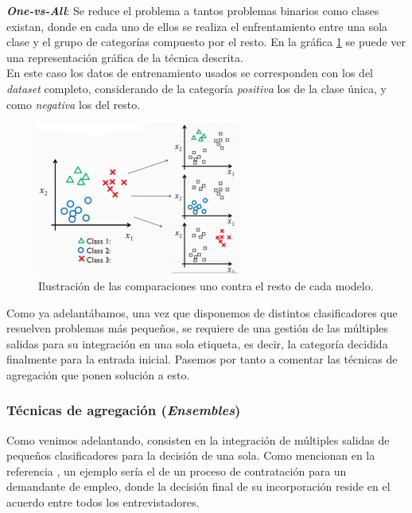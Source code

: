 \documentclass[]{article}
\begin{document}
			{\large \textbf{\textit{One-vs-All}}}: Se reduce el problema a tantos problemas binarios como clases existan, donde en cada uno de ellos se realiza el enfrentamiento entre una sola clase y el grupo de categorías compuesto por el resto. En la gráfica \ref{one-vs-all} se puede ver una representación gráfica de la técnica descrita.\\
			
			En este caso los datos de entrenamiento usados se corresponden con los del \textit{dataset} completo, considerando de la categoría \textit{positiva} los de la clase única, y como \textit{negativa} los del resto.\\
			
			\begin{figure}[h]
				\centering
				\includegraphics[width=0.6\textwidth]{./img/one-vs-all}
				\caption{Ilustración de las comparaciones uno contra el resto de cada modelo. \cite{binarization-slides}}
				\label{one-vs-all}
			\end{figure}
			
			Como ya adelantábamos, una vez que disponemos de distintos clasificadores que resuelven problemas más pequeños, se requiere de una gestión de las múltiples salidas para su integración en una sola etiqueta, es decir, la categoría decidida finalmente para la entrada inicial. Pasemos por tanto a comentar las técnicas de agregación que ponen solución a esto.
			
		\subsubsection{Técnicas de agregación (\textit{Ensembles})}
		
			Como venimos adelantando, consisten en la integración de múltiples salidas de pequeños clasificadores para la decisión de una sola. Como mencionan en la referencia \cite{ensembling-methods}, un ejemplo sería el de un proceso de contratación para un demandante de empleo, donde la decisión final de su incorporación reside en el acuerdo entre todos los entrevistadores.\\
			
\end{document}
